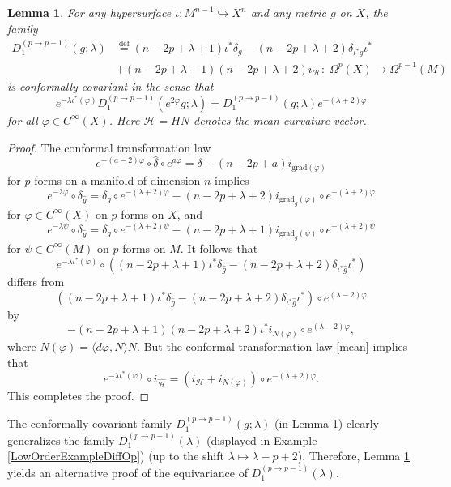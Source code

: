 \documentclass[a4paper,12pt,reqno]{amsart}
\newtheorem{lem}[theorem]{Lemma}
\numberwithin{theorem}{subsection}
\numberwithin{equation}{section}
\begin{document}
\begin{lem}\label{curved-second-type} For any hypersurface $\iota: M^{n-1} \hookrightarrow X^n$
and any metric $g$ on $X$, the family
\begin{align*}
   D_1^{(p \to p-1)}(g;\lambda) & {\stackrel{\text{def}}{=}} (n\!-\!2p\!+\!\lambda\!+\!1) \iota^* \delta_g
   - (n\!-\!2p\!+\!\lambda\!+\!2) \delta_{\iota^* g} \iota^* \\
   & + (n\!-\!2p\!+\!\lambda\!+\!1)(n\!-\!2p\!+\!\lambda\!+\!2) i_{{\mathcal H}}: \; \Omega^p(X) \to \Omega^{p-1}(M)
\end{align*}
is conformally covariant in the sense that
$$
   e^{-\lambda \iota^*(\varphi)} D_1^{(p \to p-1)}(e^{2\varphi} g;\lambda) =
   D_1^{(p \to p-1)}(g;\lambda) e^{-(\lambda+2)\varphi}
$$
for all $\varphi \in C^\infty(X)$. Here ${{\mathcal H}} = H N$ denotes the mean-curvature
vector.
\end{lem}

\begin{proof} The conformal transformation law
$$
   e^{-(a-2)\varphi} \circ \hat{\delta} \circ e^{a\varphi} = \delta -
   (n\!-\!2p\!+\!a) i_{{\text{grad}}(\varphi)}
$$
for $p$-forms on a manifold of dimension $n$ implies
$$
   e^{-\lambda \varphi} \circ \delta_{\hat{g}} = \delta_g \circ
   e^{-(\lambda+2)\varphi} - (n\!-\!2p\!+\!\lambda\!+\!2) i_{{\text{grad}}_g(\varphi)} \circ e^{-(\lambda+2)\varphi}
$$
for $\varphi \in C^\infty(X)$ on $p$-forms on $X$, and
$$
   e^{-\lambda \psi} \circ \delta_{\hat{g}} = \delta_{g} \circ e^{-(\lambda+2) \psi}
   - (n\!-\!2p\!+\!\lambda\!+\!1) i_{{\text{grad}}_{g}(\psi)} \circ e^{-(\lambda+2) \psi}
$$
for $\psi \in C^\infty(M)$ on $p$-forms on $M$. It follows that
$$
   e^{-\lambda \iota^*(\varphi)} \circ \left((n\!-\!2p\!+\!\lambda\!+\!1) \iota^*
   \delta_{\hat{g}} - (n\!-\!2p\!+\!\lambda\!+\!2) \delta_{\iota^* \hat{g}} \iota^*\right)
$$
differs from
$$
   \left((n\!-\!2p\!+\!\lambda\!+\!1) \iota^* \delta_{\hat{g}} -
   (n\!-\!2p\!+\!\lambda\!+\!2) \delta_{\iota^* \hat{g}} \iota^*\right) \circ e^{(\lambda-2) \varphi}
$$
by
$$
   -(n\!-\!2p\!+\!\lambda\!+\!1)(n\!-\!2p\!+\!\lambda\!+\!2) \iota^* i_{N(\varphi)} \circ e^{(\lambda-2)\varphi},
$$
where $N(\varphi) = \langle d\varphi,N \rangle N$. But the conformal
transformation law \eqref{mean} implies that
$$
   e^{-\lambda \iota^* (\varphi)} \circ i_{\hat{{\mathcal H}}}
   = (i_{{\mathcal H}} + i_{N(\varphi)}) \circ e^{-(\lambda+2) \varphi}.
$$
This completes the proof.
\end{proof}

The conformally covariant family $D_1^{(p\to p-1)}(g;\lambda)$ (in Lemma
\ref{curved-second-type}) clearly generalizes the family $D_1^{(p \to
p-1)}(\lambda)$ (displayed in Example \ref{LowOrderExampleDiffOp}) (up to the
shift $\lambda \mapsto \lambda-p+2$). Therefore, Lemma \ref{curved-second-type}
yields an alternative proof of the equivariance of $D_1^{(p \to
p-1)}(\lambda)$.
\end{document}
